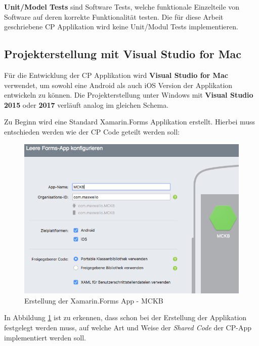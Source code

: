 	\textbf{Unit/Model Tests} sind Software Tests, welche funktionale Einzelteile von Software auf deren korrekte Funktionalität testen. Die für diese Arbeit geschriebene CP Applikation wird keine Unit/Modul Tests implementieren.

\newpage
\subsection{Projekterstellung mit Visual Studio for Mac}
\label{sec:xamarincreateproject}

	Für die Entwicklung der CP Applikation wird \textbf{Visual Studio for Mac} verwendet, um sowohl eine Android als auch iOS Version der Applikation entwickeln zu können. Die Projekterstellung unter Windows mit \textbf{Visual Studio 2015} oder \textbf{2017} verläuft analog im gleichen Schema.

	Zu Beginn wird eine Standard Xamarin.Forms Applikation erstellt. Hierbei muss entschieden werden wie der CP Code geteilt werden soll:

	\begin{figure}[h!]
		\centering
		\includegraphics[width=1\textwidth]{images/Project-Setup-one.png}
		\caption{Erstellung der Xamarin.Forms App - MCKB}
		\label{fig:xamarinprojectstart}
	\end{figure}

	In Abbildung \ref{fig:xamarinprojectstart} ist zu erkennen, dass schon bei der Erstellung der Applikation festgelegt werden muss, auf welche Art und Weise der \textit{Shared Code} der CP-App implementiert werden soll.

